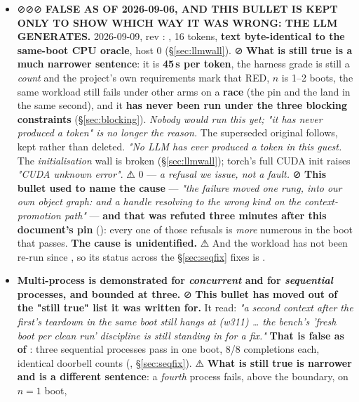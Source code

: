\documentclass[10.5pt]{article}
\begin{document}
\begin{itemize}
\item ⊘⊘⊘ \textbf{FALSE AS OF 2026-09-06, AND THIS BULLET IS KEPT ONLY TO SHOW WHICH WAY IT
  WAS WRONG: THE LLM GENERATES.} \measured{} 2026-09-09, rev :
  , 16 tokens, \textbf{text byte-identical to the same-boot CPU oracle},
  host  0 (\S\ref{sec:llmwall}). ⊘ \textbf{What is still true is a much narrower
  sentence}: it is \textbf{45\,s per token}, the harness grade is still a \emph{count} and the
  project's own requirements mark that RED, $n$ is 1--2 boots, the same workload still fails
  under other arms on a \measured{} \textbf{race} (the pin and the  land in the
  same second), and it \textbf{has never been run under the three blocking constraints}
  (\S\ref{sec:blocking}). \emph{Nobody would run this yet; "it has never produced a token" is no
  longer the reason.} The superseded original follows, kept rather than deleted.
  \newline \emph{"No LLM has ever produced a token in this guest.} The 
  \emph{initialisation} wall is broken (\S\ref{sec:llmwall}); torch's full CUDA init raises
  \emph{"CUDA unknown error"}. ⚠  0 — \emph{a refusal we issue, not a fault.}
  ⊘ \textbf{This bullet used to name the cause} — \emph{"the failure moved one rung, into our own
  object graph:  and a handle resolving to the wrong kind
  on the context-promotion path"} — \textbf{and that was refuted three minutes after this
  document's pin} (): every one of those refusals is \emph{more} numerous in the
  boot that passes. \textbf{The cause is unidentified.} ⚠ And the workload has not been re-run
  since , so its status across the \S\ref{sec:seqfix} fixes is \unver{}.
\item \textbf{Multi-process is demonstrated for \emph{concurrent} and for \emph{sequential}
  processes, and bounded at three.} ⊘ \textbf{This bullet has moved out of the "still true" list
  it was written for.} It read: \emph{"a second context after the first's teardown in the same
  boot still hangs at  (w311) \dots{} the bench's 'fresh boot per clean run'
  discipline is still standing in for a fix."} \textbf{That is false as of }: three
  sequential processes pass in one boot, 8/8 completions each, identical doorbell counts
  (, \S\ref{sec:seqfix}). ⚠ \textbf{What is still true is narrower and is a different
  sentence}: a \emph{fourth} process fails, above the  boundary, on $n = 1$ boot,

\end{itemize}
\end{document}
